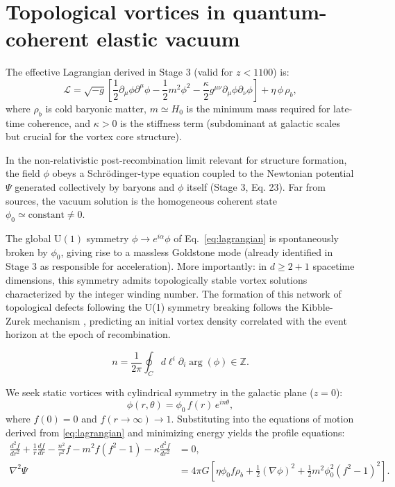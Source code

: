 \documentclass[11pt,a4paper]{article}
\begin{document}
	\section{Topological vortices in quantum-coherent elastic vacuum}
	
	The effective Lagrangian derived in Stage 3 (valid for $z<1100$) is:
	\begin{equation}
		\mathcal{L} = \sqrt{-g}\left[ \frac{1}{2} \partial_\mu \phi \partial^\mu \phi 
		- \frac{1}{2} m^2 \phi^2 
		- \frac{\kappa}{2} g^{\mu\nu} \partial_\mu \phi \partial_\nu \phi \right]
		+ \eta \, \phi \, \rho_b ,
		\label{eq:lagrangian}
	\end{equation}
	where $\rho_b$ is cold baryonic matter, $m \simeq H_0$ is the minimum mass required for late-time coherence, and $\kappa > 0$ is the stiffness term (subdominant at galactic scales but crucial for the vortex core structure).
	
	In the non-relativistic post-recombination limit relevant for structure formation, the field $\phi$ obeys a Schrödinger-type equation coupled to the Newtonian potential $\Psi$ generated collectively by baryons and $\phi$ itself (Stage 3, Eq. 23). Far from sources, the vacuum solution is the homogeneous coherent state $\phi_0 \simeq \text{constant} \neq 0$.
	
	The global $\mathrm{U}(1)$ symmetry $\phi \to e^{i\alpha} \phi$ of Eq.~\eqref{eq:lagrangian} is spontaneously broken by $\phi_0$, giving rise to a massless Goldstone mode (already identified in Stage 3 as responsible for acceleration). More importantly: in $d\geq 2+1$ spacetime dimensions, this symmetry admits topologically stable vortex solutions characterized by the integer winding number.
	The formation of this network of topological defects following the U(1) symmetry breaking follows the Kibble-Zurek mechanism \cite{Kibble1976}, predicting an initial vortex density correlated with the event horizon at the epoch of recombination.
	
	\begin{equation}
		n = \frac{1}{2\pi} \oint_C d\ell^i \partial_i \arg(\phi) \in \mathbb{Z} .
	\end{equation}
	
	We seek static vortices with cylindrical symmetry in the galactic plane ($z=0$):
	\begin{equation}
		\phi(r,\theta) = \phi_0 \, f(r) \, e^{i n \theta} ,
		\label{eq:ansatz}
	\end{equation}
	where $f(0)=0$ and $f(r\to\infty) \to 1$. Substituting into the equations of motion derived from \eqref{eq:lagrangian} and minimizing energy yields the profile equations:
	\begin{align}
		\frac{d^2 f}{dr^2} + \frac{1}{r} \frac{df}{dr} 
		- \frac{n^2}{r^2} f 
		- m^2 f (f^2 - 1)
		- \kappa \frac{d^2 f}{dr^2} &= 0 , 
		\label{eq:profile1} \\
		\nabla^2 \Psi &= 4\pi G \left[ \eta \phi_0 f \rho_b 
		+ \frac{1}{2} (\nabla \phi)^2 + \frac{1}{2} m^2 \phi_0^2 (f^2 - 1)^2 \right] .
		\label{eq:poisson}
	\end{align}
	
\end{document}
